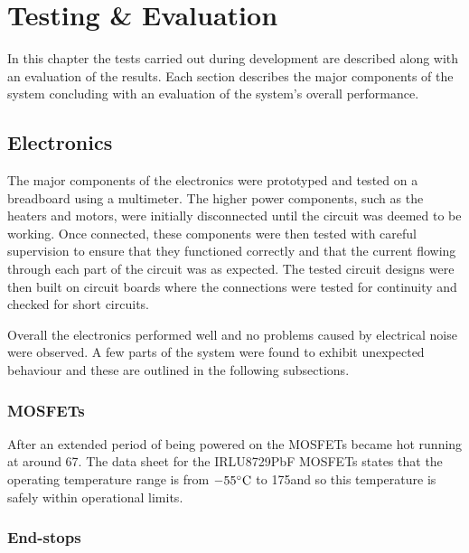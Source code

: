 \chapter{Testing \& Evaluation}
	
	
	\label{sec:testing}
	
	In this chapter the tests carried out during development are described along
	with an evaluation of the results. Each section describes the major components
	of the system concluding with an evaluation of the system's overall
	performance.
	
	\section{Electronics}
		
		The major components of the electronics were prototyped and tested on a
		breadboard using a multimeter. The higher power components, such as the
		heaters and motors, were initially disconnected until the circuit was deemed
		to be working. Once connected, these components were then tested with
		careful supervision to ensure that they functioned correctly and that the
		current flowing through each part of the circuit was as expected. The tested
		circuit designs were then built on circuit boards where the connections were
		tested for continuity and checked for short circuits.
		
		Overall the electronics performed well and no problems caused by electrical
		noise were observed. A few parts of the system were found to exhibit
		unexpected behaviour and these are outlined in the following subsections.
		
		\subsection{MOSFETs}
			
			After an extended period of being powered on the MOSFETs became hot
			running at around 67\dC. The data sheet for the IRLU8729PbF MOSFETs states
			that the operating temperature range is from $-55^\circ\textrm{C}{}$ to 175\dC and so
			this temperature is safely within operational limits.
			
		
		\subsection{End-stops}
			
